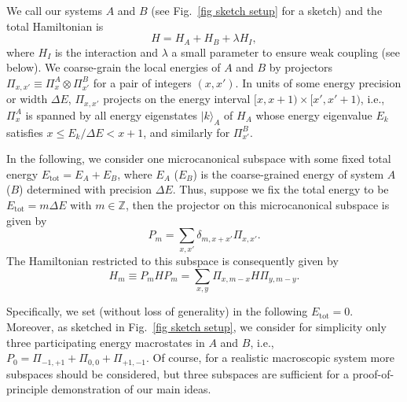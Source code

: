 \documentclass[pre,onecolumn,12pt,aps,longbibliography,nofootinbib]{revtex4-2}
\begin{document}
We call our systems $A$ and $B$ (see Fig.~\ref{fig sketch setup} for a sketch) and the total Hamiltonian is
\begin{equation}\label{eq H mic}
 H = H_A + H_B + \lambda H_I,
\end{equation}
where $H_I$ is the interaction and $\lambda$ a small parameter to ensure weak coupling (see below). We coarse-grain the local energies of $A$ and $B$ by projectors $\Pi_{x,x'} \equiv \Pi_x^A\otimes\Pi_{x'}^B$ for a pair of integers $(x,x')$. In units of some energy precision or width $\Delta E$, $\Pi_{x,x'}$ projects on the energy interval $[x,x+1)\times[x',x'+1)$, i.e., $\Pi_x^A$ is spanned by all energy eigenstates $|k\rangle_A$ of $H_A$ whose energy eigenvalue $E_k$ satisfies $x\le E_k/\Delta E < x+1$, and similarly for $\Pi_{x'}^B$.

In the following, we consider one {microcanonical subspace} with some fixed total energy 
$E_\text{tot} = E_A + E_B$, where $E_A$ ($E_B$) is the coarse-grained energy of system $A$ ($B$) determined with 
precision $\Delta E$. Thus, suppose we fix the total energy to be $E_\text{tot} = m\Delta E$ with $m\in\mathbb{Z}$, 
then the projector on this microcanonical subspace is given by
\begin{equation}
 P_{m} = \sum_{x,x'} \delta_{m,x+x'}\Pi_{x,x'}.
\end{equation}
The Hamiltonian restricted to this subspace is consequently given by
\begin{equation}\label{eq H rest}
 H_m \equiv P_{m} H P_{m} = \sum_{x,y} \Pi_{x,m-x} H \Pi_{y,m-y}.
\end{equation}

Specifically, we set (without loss of generality) in the following $E_\text{tot} = 0$. Moreover, as sketched in Fig.~\ref{fig sketch setup}, we consider for simplicity only three participating energy macrostates in $A$ and $B$, i.e., $P_0 = \Pi_{-1,+1} + \Pi_{0,0} + \Pi_{+1,-1}$. Of course, for a realistic macroscopic system more subspaces should be considered, but three subspaces are sufficient for a proof-of-principle demonstration of our main ideas.
\end{document}

